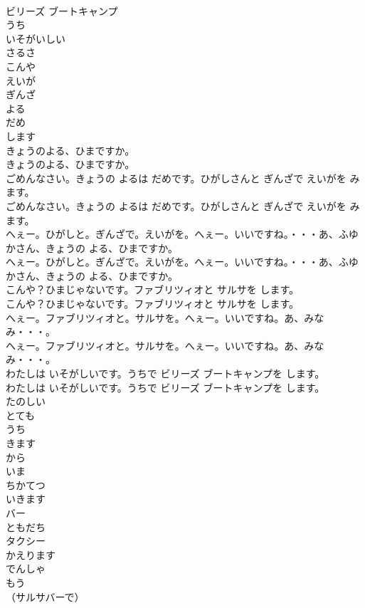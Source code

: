 \documentclass[8pt]{extreport}
\begin{document}
\begin{CJK}{UTF8}{min}
\\	ビリーズ ブートキャンプ
\\	うち
\\	いそがいしい
\\	さるさ
\\	こんや
\\	えいが
\\	ぎんざ
\\	よる
\\	だめ
\\	します
\\	きょうのよる、ひまですか。	
\\	きょうのよる、ひまですか。 
\\	ごめんなさい。きょうの よるは だめです。ひがしさんと ぎんざで えいがを みます。	
\\	ごめんなさい。きょうの よるは だめです。ひがしさんと ぎんざで えいがを みます。 
\\	へぇー。ひがしと。ぎんざで。えいがを。へぇー。いいですね。・・・あ、ふゆかさん、きょうの よる、ひまですか。	
\\	へぇー。ひがしと。ぎんざで。えいがを。へぇー。いいですね。・・・あ、ふゆかさん、きょうの よる、ひまですか。 
\\	こんや？ひまじゃないです。ファブリツィオと サルサを します。	
\\	こんや？ひまじゃないです。ファブリツィオと サルサを します。 
\\	へぇー。ファブリツィオと。サルサを。へぇー。いいですね。あ、みなみ・・・。	
\\	へぇー。ファブリツィオと。サルサを。へぇー。いいですね。あ、みなみ・・・。 
\\	わたしは いそがしいです。うちで ビリーズ ブートキャンプを します。	
\\	わたしは いそがしいです。うちで ビリーズ ブートキャンプを します。 
\\	たのしい
\\	とても
\\	うち
\\	きます
\\	から
\\	いま
\\	ちかてつ
\\	いきます
\\	バー
\\	ともだち
\\	タクシー
\\	かえります
\\	でんしゃ
\\	もう
\\	（サルサバーで）	

\end{CJK}
\end{document}
